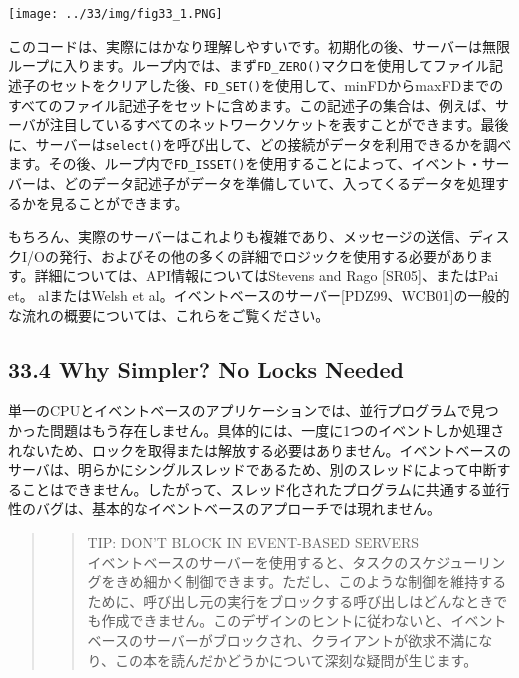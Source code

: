 \texttt{[image: ../33/img/fig33\_1.PNG]}

このコードは、実際にはかなり理解しやすいです。初期化の後、サーバーは無限ループに入ります。ループ内では、まず\texttt{FD\_ZERO()}マクロを使用してファイル記述子のセットをクリアした後、\texttt{FD\_SET()}を使用して、minFDからmaxFDまでのすべてのファイル記述子をセットに含めます。この記述子の集合は、例えば、サーバが注目しているすべてのネットワークソケットを表すことができます。最後に、サーバーは\texttt{select()}を呼び出して、どの接続がデータを利用できるかを調べます。その後、ループ内で\texttt{FD\_ISSET()}を使用することによって、イベント・サーバーは、どのデータ記述子がデータを準備していて、入ってくるデータを処理するかを見ることができます。

もちろん、実際のサーバーはこれよりも複雑であり、メッセージの送信、ディスクI/Oの発行、およびその他の多くの詳細でロジックを使用する必要があります。詳細については、API情報についてはStevens
and Rago {[}SR05{]}、またはPai et。 alまたはWelsh et
al。イベントベースのサーバー{[}PDZ99、WCB01{]}の一般的な流れの概要については、これらをご覧ください。

\hypertarget{why-simpler-no-locks-needed}{%
\subsection*{33.4 Why Simpler? No Locks
Needed}\label{why-simpler-no-locks-needed}}

単一のCPUとイベントベースのアプリケーションでは、並行プログラムで見つかった問題はもう存在しません。具体的には、一度に1つのイベントしか処理されないため、ロックを取得または解放する必要はありません。イベントベースのサーバは、明らかにシングルスレッドであるため、別のスレッドによって中断することはできません。したがって、スレッド化されたプログラムに共通する並行性のバグは、基本的なイベントベースのアプローチでは現れません。

\begin{quote}
\begin{quote}
TIP: DON'T BLOCK IN EVENT-BASED SERVERS\\
イベントベースのサーバーを使用すると、タスクのスケジューリングをきめ細かく制御できます。ただし、このような制御を維持するために、呼び出し元の実行をブロックする呼び出しはどんなときでも作成できません。このデザインのヒントに従わないと、イベントベースのサーバーがブロックされ、クライアントが欲求不満になり、この本を読んだかどうかについて深刻な疑問が生じます。
\end{quote}
\end{quote}

